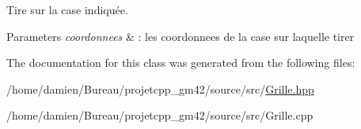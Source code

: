 Tire sur la case indiquée. 


\begin{DoxyParams}{Parameters}
{\em coordonnees} & \-: les coordonnees de la case sur laquelle tirer \\
\hline
\end{DoxyParams}


The documentation for this class was generated from the following files\-:\begin{DoxyCompactItemize}
\item 
/home/damien/\-Bureau/projetcpp\-\_\-gm42/source/src/\hyperlink{Grille_8hpp}{Grille.\-hpp}\item 
/home/damien/\-Bureau/projetcpp\-\_\-gm42/source/src/Grille.\-cpp\end{DoxyCompactItemize}
